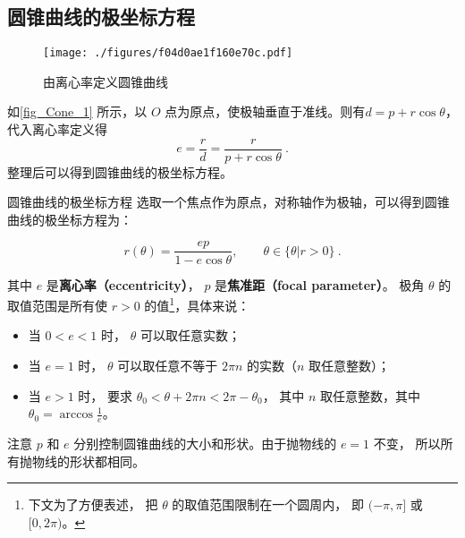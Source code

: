 
\begin{issues}
\issueDraft
\end{issues}


\subsection{圆锥曲线的极坐标方程}

\begin{figure}[ht]
\centering
\texttt{[image: ./figures/f04d0ae1f160e70c.pdf]}
\caption{由离心率定义圆锥曲线}\label{fig_Cone_1}
\end{figure}

如\autoref{fig_Cone_1} 所示，以 $O$ 点为原点，使极轴垂直于准线。则有$d = p + r \cos \theta$，代入离心率定义得
\begin{equation}\label{eq_Cone_2}
e=\frac{r}{d}=\frac{r}{p + r \cos \theta }~.
\end{equation}
整理后可以得到圆锥曲线的极坐标方程。
\begin{definition}{圆锥曲线的极坐标方程}
选取一个焦点作为原点，对称轴作为极轴，可以得到圆锥曲线的极坐标方程为：

\begin{equation}\label{eq_Cone_3}
r(\theta) = \frac{ep}{1 - e\cos \theta },\qquad\theta\in\{\theta|r>0\}~.
\end{equation}

其中 $e$ 是\textbf{离心率（eccentricity）}， $p$ 是\textbf{焦准距（focal parameter）}。 极角 $\theta$ 的取值范围是所有使 $r>0$ 的值\footnote{下文为了方便表述， 把 $\theta$ 的取值范围限制在一个圆周内， 即 $(-\pi,\pi]$ 或 $[0, 2\pi)$。}，具体来说：
\begin{itemize}
\item 当 $0 < e < 1$ 时，  $\theta$ 可以取任意实数；
\item 当 $e = 1$ 时， $\theta$ 可以取任意不等于 $2\pi n$ 的实数（$n$ 取任意整数）；
\item 当 $e > 1$ 时， 要求 $\theta_0< \theta + 2\pi n < 2\pi-\theta_0$， 其中 $n$ 取任意整数，其中$\displaystyle\theta_0 = \arccos\frac{1}{e}$。
\end{itemize}  
\end{definition}

注意 $p$ 和 $e$ 分别控制圆锥曲线的大小和形状。由于抛物线的 $e = 1$ 不变， 所以所有抛物线的形状都相同。

